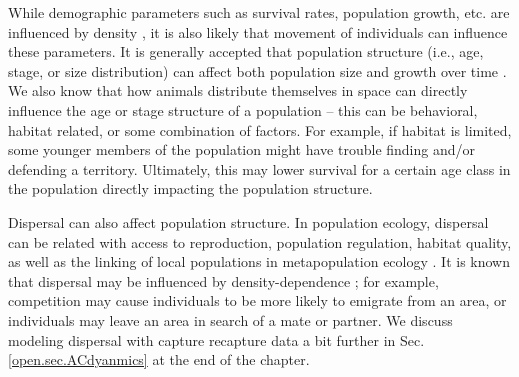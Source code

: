 While demographic parameters such as survival rates, population
growth, etc. are influenced by density \citep{fowler:1981,
  murdoch:1994, saether_etal:2002}, it is also likely that movement
of individuals can influence these parameters.  It is generally
accepted that population structure (i.e., age, stage, or size
distribution) can affect both population size and growth over time
\citep{caswell_werner:1978}.  We also know that how animals distribute
themselves in space can directly influence the age or stage structure
of a population -- this can be behavioral, habitat related, or some
combination of factors.  For example, if habitat is limited, some
younger members of the population might have trouble finding and/or
defending a territory.  Ultimately, this may lower survival for a
certain age class in the population directly impacting the population
structure.

Dispersal can also affect population structure.  In population
ecology, dispersal can be related with access to reproduction,
population regulation, habitat quality, as well as the linking of
local populations in metapopulation ecology \citep{clobert_etal:2001,
  ovaskainen:2004, ovaskainen_etal:2008}.  It is known that dispersal
may be influenced by density-dependence \citep{matthysen:2005}; for
example, competition may cause individuals to be more likely to
emigrate from an area, or individuals may leave an area in search of a
mate or partner.  We discuss modeling dispersal with capture recapture
data a bit further in Sec. \ref{open.sec.ACdyanmics} at the end of the
chapter.




